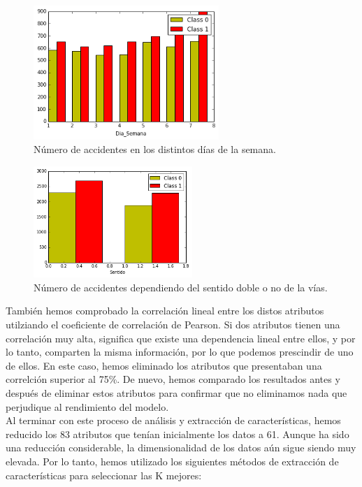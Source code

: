 \documentclass[journal,twoside]{JoPhA}
\begin{document}
\begin{figure}[htb!]
	\begin{center}
		\includegraphics[width=7cm]{figs/dia_semana.png}
		\caption{Número de accidentes en los distintos días de la semana.}
	\end{center}
	\label{fig:graf_tendencia}
\end{figure}
\begin{figure}[htb!]
	\begin{center}
		\includegraphics[width=6cm]{figs/hora.png}
		\caption{Número de accidentes dependiendo del sentido doble o no de la vías.}
	\end{center}
	\label{fig:graf_no_tendencia}
\end{figure}

También hemos comprobado la correlación lineal entre los distos atributos utilziando el coeficiente de correlación de Pearson. Si dos atributos tienen una correlación muy alta, significa que existe una dependencia lineal entre ellos, y por lo tanto, comparten la misma información, por lo que podemos prescindir de uno de ellos. En este caso, hemos eliminado los atributos que presentaban una correlción superior al 75\%. De nuevo, hemos comparado los resultados antes y después de eliminar estos atributos para confirmar que no eliminamos nada que perjudique al rendimiento del modelo. \\

Al terminar con este proceso de análisis y extracción de características, hemos reducido los 83 atributos que tenían inicialmente los datos a 61. Aunque ha sido una reducción considerable, la dimensionalidad de los datos aún sigue siendo muy elevada. Por lo tanto, hemos utilizado los siguientes métodos de extracción de características para seleccionar las K mejores: \\
\end{document}
